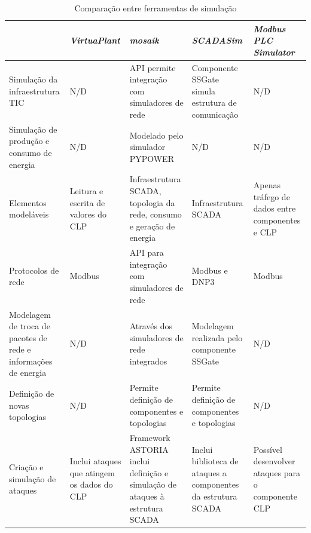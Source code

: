 \documentclass[cic,tc]{iiufrgs}
\begin{document}
\begin{table}[h]
    \caption{Comparação entre ferramentas de simulação}
    \centering
    \scriptsize
        \begin{tabular}{m{2.4cm}|m{2.4cm}|m{2.4cm}|m{2.4cm}|m{2.4cm}}
          \hline
           & \textit{VirtuaPlant} & \textit{mosaik} & \textit{SCADASim} & \textit{Modbus PLC Simulator} \\
          \hline
          \hline
          Simulação da infraestrutura TIC & N/D & API permite integração com simuladores de rede & Componente SSGate simula estrutura de comunicação & N/D \\
          \hline
          Simulação de produção e consumo de energia & N/D & Modelado pelo simulador PYPOWER & N/D & N/D \\
          \hline
          Elementos modeláveis & Leitura e escrita de valores do CLP & Infraestrutura SCADA, topologia da rede, consumo e geração de energia & Infraestrutura SCADA & Apenas tráfego de dados entre componentes e CLP \\
          \hline 
          Protocolos de rede & Modbus & API para integração com simuladores de rede & Modbus e DNP3 & Modbus \\
          \hline
          Modelagem de troca de pacotes de rede e informações de energia & N/D & 	Através dos simuladores de rede integrados & Modelagem realizada pelo componente SSGate & N/D \\
          \hline
          Definição de novas topologias & N/D & Permite definição de componentes e topologias & Permite definição de componentes e topologias & N/D \\
          \hline
          Criação e simulação de ataques & Inclui ataques que atingem os dados do CLP & Framework ASTORIA inclui definição e simulação de ataques à estrutura SCADA & Inclui biblioteca de ataques a componentes da estrutura SCADA & Possível desenvolver ataques para o componente CLP \\
          \hline
        \end{tabular}
    \label{tbl:ex1}
\end{table}
\end{document}
